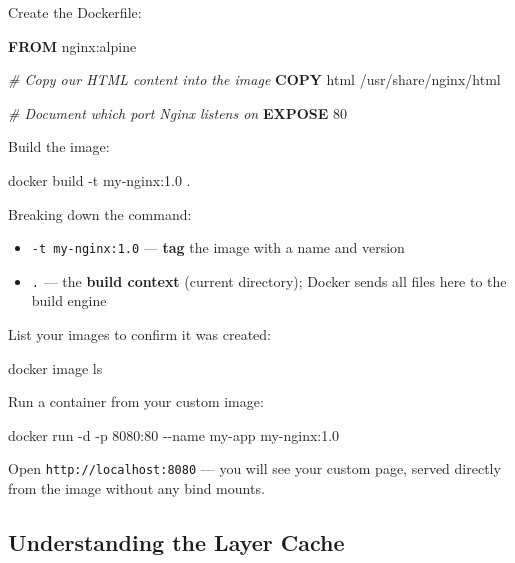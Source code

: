 \documentclass[11pt,american,a4paper,openany]{book}
\providecommand{\tightlist}{%
  \setlength{\itemsep}{2pt}\setlength{\parskip}{0pt}}
\newenvironment{Shaded}{}{}
\newcommand{\CommentTok}[1]{\textcolor[rgb]{0.38,0.63,0.69}{\textit{#1}}}
\newcommand{\KeywordTok}[1]{\textcolor[rgb]{0.00,0.44,0.13}{\textbf{#1}}}
\newcommand{\NormalTok}[1]{#1}
\begin{document}
Create the Dockerfile:

\begin{Shaded}
\begin{Highlighting}[]
\KeywordTok{FROM}\NormalTok{ nginx:alpine}

\CommentTok{\# Copy our HTML content into the image}
\KeywordTok{COPY}\NormalTok{ html /usr/share/nginx/html}

\CommentTok{\# Document which port Nginx listens on}
\KeywordTok{EXPOSE}\NormalTok{ 80}
\end{Highlighting}
\end{Shaded}

Build the image:

\begin{Shaded}
\begin{Highlighting}[]
\NormalTok{docker build {-}t my{-}nginx:1.0 .}
\end{Highlighting}
\end{Shaded}

Breaking down the command:

\begin{itemize}
\tightlist
\item
  \texttt{-t\ my-nginx:1.0} --- \textbf{tag} the image with a name and
  version
\item
  \texttt{.} --- the \textbf{build context} (current directory); Docker
  sends all files here to the build engine
\end{itemize}

List your images to confirm it was created:

\begin{Shaded}
\begin{Highlighting}[]
\NormalTok{docker image ls}
\end{Highlighting}
\end{Shaded}

Run a container from your custom image:

\begin{Shaded}
\begin{Highlighting}[]
\NormalTok{docker run {-}d {-}p 8080:80 {-}{-}name my{-}app my{-}nginx:1.0}
\end{Highlighting}
\end{Shaded}

Open \texttt{http://localhost:8080} --- you will see your custom page,
served directly from the image without any bind mounts.

\subsection{Understanding the Layer
Cache}\label{understanding-the-layer-cache}
\end{document}
